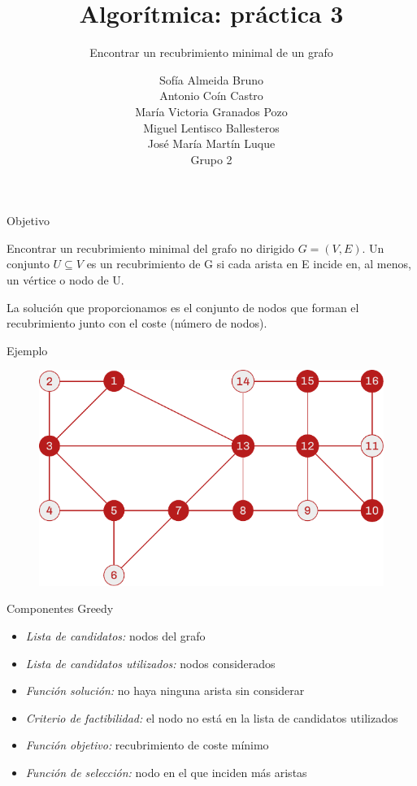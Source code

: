 \documentclass[spanish]{beamer}
\title{Algorítmica: práctica 3}
\subtitle{Encontrar un recubrimiento minimal de un grafo}
\author{Sofía Almeida Bruno\\ Antonio Coín Castro\\ María Victoria Granados Pozo\\ Miguel Lentisco Ballesteros\\ José María Martín Luque\\ \vspace{1em}Grupo 2}
\begin{document}
\maketitle

\begin{frame}{Objetivo}

	Encontrar un recubrimiento minimal del grafo no dirigido $G = (V, E)$.
	Un conjunto $U \subseteq V$ es un recubrimiento de G si cada arista en E incide en, al menos, un vértice o nodo de U.

	La solución que proporcionamos es el conjunto de nodos que forman el recubrimiento junto con el coste (número de nodos).
\end{frame}

\begin{frame}{Ejemplo}
	\begin{figure}[H]
		\centering \includegraphics{./img/grafo-pres.pdf}
	\end{figure}
\end{frame}

\begin{frame}{Componentes Greedy}
	\begin{itemize}
		\item \textit{Lista de candidatos:} nodos del grafo
		\item \textit{Lista de candidatos utilizados:} nodos considerados
		\item \textit{Función solución:} no haya ninguna arista sin considerar
		\item \textit{Criterio de factibilidad:} el nodo no está en la lista de candidatos utilizados
		\item \textit{Función objetivo:} recubrimiento de coste mínimo
		\item \textit{Función de selección:} nodo en el que inciden más aristas
	\end{itemize}
\end{frame}
\end{document}
